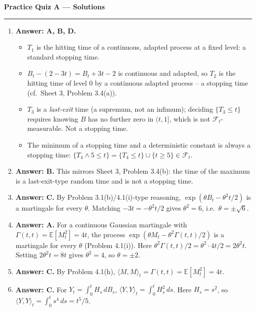 \documentclass[11pt]{article}
\newcommand{\E}{\mathbb{E}}
\newcommand{\ans}[1]{\par\noindent\textbf{\color{blue!50!black}Answer: #1}}
\begin{document}
\begin{center}
{\LARGE\bfseries Practice Quiz A --- Solutions}
\end{center}
\vspace{6pt}
\hrule
\vspace{10pt}

\begin{enumerate}

\item[\textbf{Q1.}] \ans{A, B, D.}
\begin{itemize}[nosep]
\item[A] $T_1$ is the hitting time of a continuous, adapted process at a fixed level: a standard stopping time.
\item[B] $B_t-(2-3t)=B_t+3t-2$ is continuous and adapted, so $T_2$ is the hitting time of level $0$ by a continuous adapted process -- a stopping time (cf.\ Sheet 3, Problem 3.4(a)).
\item[C] $T_3$ is a \emph{last-exit} time (a supremum, not an infimum); deciding $\{T_3\le t\}$ requires knowing $B$ has no further zero in $(t,1]$, which is not $\mathcal F_t$-measurable. Not a stopping time.
\item[D] The minimum of a stopping time and a deterministic constant is always a stopping time: $\{T_4\wedge5\le t\}=\{T_4\le t\}\cup\{t\ge5\}\in\mathcal F_t$.
\end{itemize}

\item[\textbf{Q2.}] \ans{B.} This mirrors Sheet 3, Problem 3.4(b): the time of the maximum is a last-exit-type random time and is not a stopping time.

\item[\textbf{Q3.}] \ans{C.} By Problem 3.1(b)/4.1(i)-type reasoning, $\exp(\theta B_t-\theta^2t/2)$ is a martingale for every $\theta$. Matching $-3t=-\theta^2t/2$ gives $\theta^2=6$, i.e.\ $\theta=\pm\sqrt6$.

\item[\textbf{Q4.}] \ans{A.} For a continuous Gaussian martingale with $\Gamma(t,t)=\E[M_t^2]=4t$, the process $\exp(\theta M_t-\theta^2\Gamma(t,t)/2)$ is a martingale for every $\theta$ (Problem 4.1(i)). Here $\theta^2\Gamma(t,t)/2=\theta^2\cdot4t/2=2\theta^2t$. Setting $2\theta^2t=8t$ gives $\theta^2=4$, so $\theta=\pm2$.

\item[\textbf{Q5.}] \ans{C.} By Problem 4.1(h), $\langle M,M\rangle_t=\Gamma(t,t)=\E[M_t^2]=4t$.

\item[\textbf{Q6.}] \ans{C.} For $Y_t=\int_0^t H_s\,dB_s$, $\langle Y,Y\rangle_t=\int_0^t H_s^2\,ds$. Here $H_s=s^2$, so $\langle Y,Y\rangle_t=\int_0^t s^4\,ds=t^5/5$.


\end{enumerate}
\end{document}
